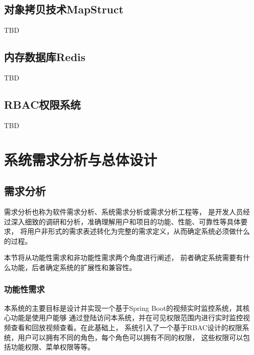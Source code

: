 
\section{对象拷贝技术MapStruct}
TBD
\section{内存数据库Redis}
TBD
\section{RBAC权限系统}
TBD

\chapter{系统需求分析与总体设计}

\section{需求分析}

需求分析也称为软件需求分析、系统需求分析或需求分析工程等，
是开发人员经过深入细致的调研和分析，准确理解用户和项目的功能、性能、可靠性等具体要求，
将用户非形式的需求表述转化为完整的需求定义，从而确定系统必须做什么的过程。\cite{demand_analysis}

本节将从功能性需求和非功能性需求两个角度进行阐述，
前者确定系统需要有什么功能，后者确定系统的扩展性和兼容性。

\subsection{功能性需求}
本系统的主要目标是设计并实现一个基于Spring Boot的视频实时监控系统，其核心功能是使用户能够
通过登陆访问本系统，并在可见权限范围内进行实时监控视频查看和回放视频查看。在此基础上，
系统引入了一个基于RBAC设计的权限系统，用户可以拥有不同的角色，每个角色可以拥有不同的权限，
这些权限可以包括功能权限、菜单权限等等。

